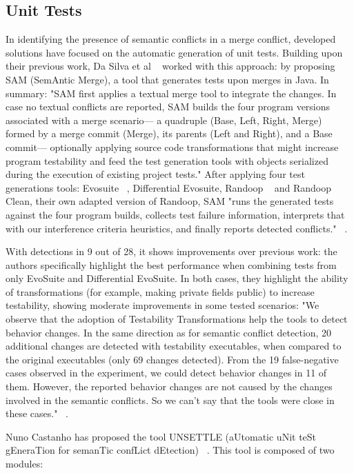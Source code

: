 \subsection{Unit Tests}

In identifying the presence of semantic conflicts in a merge conflict, developed solutions have focused on the automatic generation of unit tests. Building upon their previous work, Da Silva et al ~\citep{kn:leuson2} worked with this approach: by proposing SAM (SemAntic Merge), a tool that generates tests upon merges in Java. In summary: "SAM first applies a textual merge tool to integrate the changes. In case no textual conflicts are reported, SAM builds the four program versions
associated with a merge scenario— a quadruple (Base, Left, Right, Merge)
formed by a merge commit (Merge), its parents (Left and Right), and a Base
commit— optionally applying source code transformations that might increase
program testability and feed the test generation tools with objects serialized
during the execution of existing project tests." After applying four test generations tools: Evosuite ~\citep{kn:evosuite}, Differential Evosuite, Randoop ~\citep{kn:randoop} and Randoop Clean, their own adapted version of Randoop, SAM "runs the generated tests against the four program builds, collects test failure information, interprets
that with our interference criteria heuristics, and finally reports detected
conflicts." ~\citep{kn:leuson2}.

With detections in 9 out of 28, it shows improvements over previous work: the authors specifically highlight the best performance when combining tests from only EvoSuite and Differential EvoSuite. In both cases, they highlight the ability of transformations (for example, making private fields public) to increase testability, showing moderate improvements in some tested scenarios: "We observe that the adoption of Testability Transformations help the tools
to detect behavior changes. In the same direction as for semantic conflict
detection, 20 additional changes are detected with testability executables,
when compared to the original executables (only 69 changes detected). From
the 19 false-negative cases observed in the experiment, we could detect
behavior changes in 11 of them. However, the reported behavior changes are
not caused by the changes involved in the semantic conflicts. So we can’t say
that the tools were close in these cases."  ~\citep{kn:leuson2}.


Nuno Castanho has proposed the tool UNSETTLE (aUtomatic uNit teSt gEneraTion for semanTic confLict dEtection) ~\citep{kn:nuno}. This tool is composed of two modules:

